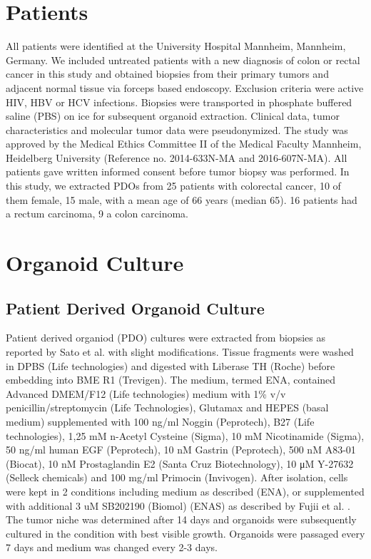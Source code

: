 \begin{flushleft}
\section{Patients}
All patients were identified at the University Hospital Mannheim, Mannheim, Germany. We included untreated patients with a new diagnosis of colon or rectal cancer in this study and obtained biopsies from their primary tumors and adjacent normal tissue via forceps based endoscopy. Exclusion criteria were active HIV, HBV or HCV infections. Biopsies were transported in phosphate buffered saline (PBS) on ice for subsequent organoid extraction. Clinical data, tumor characteristics and molecular tumor data were pseudonymized. The study was approved by the Medical Ethics Committee II of the Medical Faculty Mannheim, Heidelberg University (Reference no. 2014-633N-MA and 2016-607N-MA). All patients gave written informed consent before tumor biopsy was performed. In this study, we extracted PDOs from 25 patients with colorectal cancer, 10 of them female, 15 male, with a mean age of 66 years (median 65). 16 patients had a rectum carcinoma, 9 a colon carcinoma.

\section{Organoid Culture}

\subsection{Patient Derived Organoid Culture}
Patient derived organiod (PDO) cultures were extracted from biopsies as reported by Sato et al. \cite{Sato2011-lh} with slight modifications. Tissue fragments were washed in DPBS (Life technologies) and digested with Liberase TH (Roche) before embedding into BME R1 (Trevigen). The medium, termed ENA, contained Advanced DMEM/F12 (Life technologies) medium with 1\% v/v penicillin/streptomycin (Life Technologies), Glutamax and HEPES (basal medium) supplemented with 100 ng/ml Noggin (Peprotech), B27 (Life technologies), 1,25 mM n-Acetyl Cysteine (Sigma), 10 mM Nicotinamide (Sigma), 50 ng/ml human EGF (Peprotech), 10 nM Gastrin (Peprotech), 500 nM A83-01 (Biocat), 10 nM Prostaglandin E2 (Santa Cruz Biotechnology), 10 μM Y-27632 (Selleck chemicals) and 100 mg/ml Primocin (Invivogen). After isolation, cells were kept in 2 conditions including medium as described (ENA), or supplemented with additional 3 uM SB202190 (Biomol) (ENAS) as described by Fujii et al. \cite{Fujii2016ATumorigenesi  }. 
The tumor niche was determined after 14 days and organoids were subsequently cultured in the condition with best visible growth. 
Organoids were passaged every 7 days and medium was changed every 2-3 days.


\end{flushleft}
